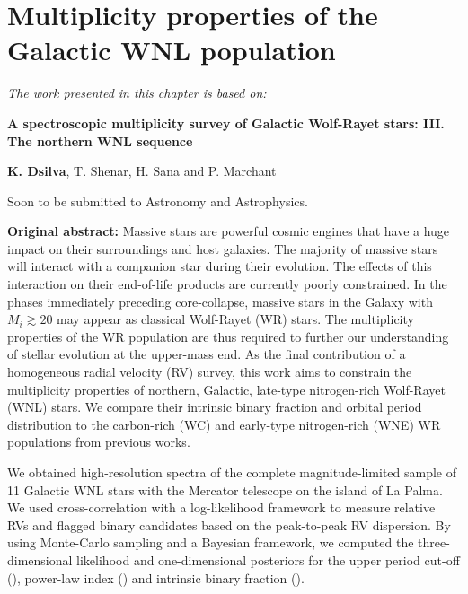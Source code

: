 \chapter{Multiplicity properties of the Galactic WNL population}\label{ch:wnl}

\textit{The work presented in this chapter is based on:}

\textbf{A spectroscopic multiplicity survey of Galactic Wolf-Rayet stars: III. The northern WNL sequence}

\textbf{K. Dsilva}, T. Shenar, H. Sana and P. Marchant

Soon to be submitted to {\sc Astronomy and Astrophysics}.
\newpage

\begin{abs}
\vspace{3mm}
\textbf{Original abstract:}
\newline \newline
Massive stars are powerful cosmic engines that have a huge impact on their surroundings and host galaxies. The majority of massive stars will interact with a companion star during their evolution. The effects of this interaction on their end-of-life products are currently poorly constrained. In the phases immediately preceding core-collapse, massive stars in the Galaxy with $M_i \gtrsim 20$ may appear as classical Wolf-Rayet (WR) stars. The multiplicity properties of the WR population are thus required to further our understanding of stellar evolution at the upper-mass end.
As the final contribution of a homogeneous radial velocity (RV) survey, this work aims to constrain the multiplicity properties of northern, Galactic, late-type nitrogen-rich Wolf-Rayet (WNL) stars. We compare their intrinsic binary fraction and orbital period distribution to the carbon-rich (WC) and early-type nitrogen-rich (WNE) WR populations from previous works.

We obtained high-resolution spectra of the complete magnitude-limited sample of 11 Galactic WNL stars with the Mercator telescope on the island of La Palma. We used cross-correlation with a log-likelihood framework to measure relative RVs and flagged binary candidates based on the peak-to-peak RV dispersion. By using Monte-Carlo sampling and a Bayesian framework, we computed the three-dimensional likelihood and one-dimensional posteriors for the upper period cut-off (\logPmaxWNL{}), power-law index (\piWNL{}) and intrinsic binary fraction (\fintWNL{}).


\end{abs}
